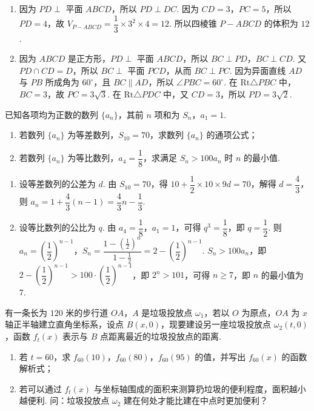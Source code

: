 \begin{solution}
\begin{enumerate}
\item 因为 \(PD\perp\) 平面 \(ABCD\)，所以 \(PD\perp DC\). 因为 \(CD=3\)，\(PC=5\)，所以 \(PD=4\)，故 \(V_{P-ABCD}=\dfrac{1}{3}\times3^2\times4=12\). 所以四棱锥 \(P-ABCD\) 的体积为 \(12\).
\item 因为 \(ABCD\) 是正方形，\(PD\perp\) 平面 \(ABCD\)，所以 \(BC\perp PD\)，\(BC\perp CD\). 又 \(PD\cap CD=D\)，所以 \(BC\perp\) 平面 \(PCD\)，从而 \(BC\perp PC\). 因为异面直线 \(AD\) 与 \(PB\) 所成角为 \(60^\circ\)，且 \(BC\parallel AD\)，所以 \(\angle PBC=60^\circ\). 在 \(\mathrm{Rt}\triangle PBC\) 中，\(BC=3\)，故 \(PC=3\sqrt{3}\). 在 \(\mathrm{Rt}\triangle PDC\) 中，又 \(CD=3\)，所以 \(PD=3\sqrt{2}\).
\end{enumerate}
\end{solution}

\begin{problem}
已知各项均为正数的数列 \(\{a_n\}\)，其前 \(n\) 项和为 \(S_n\)，\(a_1=1\).
\begin{enumerate}
\item 若数列 \(\{a_n\}\) 为等差数列，\(S_{10}=70\)，求数列 \(\{a_n\}\) 的通项公式；
\item 若数列 \(\{a_n\}\) 为等比数列，\(a_4=\dfrac{1}{8}\)，求满足 \(S_n>100a_n\) 时 \(n\) 的最小值.
\end{enumerate}
\end{problem}

\begin{solution}
\begin{enumerate}
\item 设等差数列的公差为 \(d\). 由 \(S_{10}=70\)，得 \(10+\dfrac{1}{2}\times10\times9d=70\)，解得 \(d=\dfrac{4}{3}\)，则 \(a_n=1+\dfrac{4}{3}(n-1)=\dfrac{4}{3}n-\dfrac{1}{3}\).
\item 设等比数列的公比为 \(q\). 由 \(a_4=\dfrac{1}{8}\)，\(a_1=1\)，可得 \(q^3=\dfrac{1}{8}\)，即 \(q=\dfrac{1}{2}\). 则 \(a_n=\left(\dfrac{1}{2}\right)^{n-1}\)，\(S_n=\dfrac{1-\left(\frac{1}{2}\right)^n}{1-\frac{1}{2}}=2-\left(\dfrac{1}{2}\right)^{n-1}\). \(S_n>100a_n\)，即 \(2-\left(\dfrac{1}{2}\right)^{n-1}>100\cdot\left(\dfrac{1}{2}\right)^{n-1}\)，即 \(2^n>101\)，可得 \(n\geq7\)，即 \(n\) 的最小值为 \(7\).
\end{enumerate}
\end{solution}

\begin{problem}
有一条长为 \(120\) 米的步行道 \(OA\)，\(A\) 是垃圾投放点 \(\omega_1\)，若以 \(O\) 为原点，\(OA\) 为 \(x\) 轴正半轴建立直角坐标系，设点 \(B(x,0)\)，现要建设另一座垃圾投放点 \(\omega_2(t,0)\)，函数 \(f_t(x)\) 表示与 \(B\) 点距离最近的垃圾投放点的距离.
\begin{enumerate}
\item 若 \(t=60\)，求 \(f_{60}(10)\)，\(f_{60}(80)\)，\(f_{60}(95)\) 的值，并写出 \(f_{60}(x)\) 的函数解析式；
\item 若可以通过 \(f_t(x)\) 与坐标轴围成的面积来测算扔垃圾的便利程度，面积越小越便利. 问：垃圾投放点 \(\omega_2\) 建在何处才能比建在中点时更加便利？
\end{enumerate}
\end{problem}

